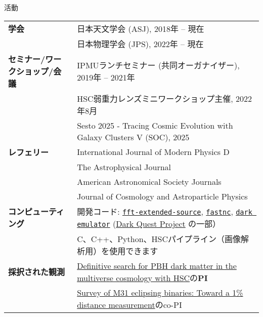 \begin{rSection}{活動}
  \begin{tabular}{ @{} >{\bfseries}l @{\hspace{6ex}} p{}}
  学会                        & 日本天文学会 (ASJ), 2018年 -- 現在 \\
                              & 日本物理学会 (JPS), 2022年 -- 現在  \\
  セミナー/ワークショップ/会議     & IPMUランチセミナー (共同オーガナイザー), 2019年 -- 2021年 \\
                              & HSC弱重力レンズミニワークショップ主催, 2022年8月  \\
                              & Sesto 2025 - Tracing Cosmic Evolution with Galaxy Clusters V (SOC), 2025\\
  レフェリー                  & International Journal of Modern Physics D \\
                              & The Astrophysical Journal \\
                              & American Astronomical Society Journals \\
                              & Journal of Cosmology and Astroparticle Physics \\
  コンピューティング          & 開発コード: \href{https://github.com/git-sunao/fft-extended-source}{\tt fft-extended-source},
                                \href{https://github.com/git-sunao/fastnc}{\tt fastnc},
                                \href{https://dark-emulator.readthedocs.io/en/latest/}{\tt dark emulator} (\href{https://darkquestcosmology.github.io}{Dark Quest Project} の一部） \\
                              & C、C++、Python、HSCパイプライン（画像解析用）を使用できます \\
  採択された観測              & \href{https://subarutelescope.org/Observing/Schedule/S20B_abstract/S20B0032abst.html}{Definitive search for PBH dark matter in the multiverse cosmology with HSC}の\textbf{PI} \\
                              & \href{https://www.naoj.org/Observing/Schedule/s24b.html}{Survey of M31 eclipsing binaries: Toward a 1\% distance measurement}のco-PI
  \end{tabular}
\end{rSection}

